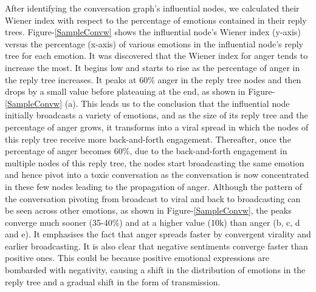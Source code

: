 After identifying the conversation graph's influential nodes, we calculated their Wiener index with respect to the percentage of emotions contained in their reply trees. Figure-\ref{SampleConvw} shows the influential node's Wiener index (y-axis) versus the percentage (x-axis) of various emotions in the influential node's reply tree for each emotion. It was discovered that the Wiener index for anger tends to increase the most. It begins low and starts to rise as the percentage of anger in the reply tree increases. It peaks at 60\% anger in the reply tree nodes and then drops by a small value before plateauing at the end, as shown in Figure-\ref{SampleConvw} (a). This leads us to the conclusion that the influential node initially broadcasts a variety of emotions, and as the size of its reply tree and the percentage of anger grows, it transforms into a viral spread in which the nodes of this reply tree receive more back-and-forth engagement. Thereafter, once the percentage of anger becomes 60\%, due to the back-and-forth engagement in multiple nodes of this reply tree, the nodes start broadcasting the same emotion and hence pivot into a toxic conversation as the conversation is now concentrated in these few nodes leading to the propagation of anger. Although the pattern of the conversation pivoting from broadcast to viral and back to broadcasting can be seen across other emotions, as shown in Figure-\ref{SampleConvw}, the peaks converge much sooner (35-40\%) and at a higher value (10k) than anger (b, c, d and e). It emphasises the fact that anger spreads faster by convergent virality and earlier broadcasting. It is also clear that negative sentiments converge faster than positive ones. This could be because positive emotional expressions are bombarded with negativity, causing a shift in the distribution of emotions in the reply tree and a gradual shift in the form of transmission.


